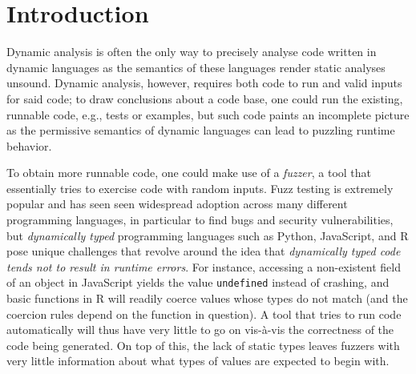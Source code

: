 \documentclass[sigplan,anonymous,review]{acmart}
\begin{document}
\begin{abstract}

\end{abstract}

\maketitle

\section{Introduction}
\label{sec:introduction}

Dynamic analysis is often the only way to precisely analyse code written in dynamic languages as the semantics of these languages render static analyses unsound. 
Dynamic analysis, however, requires both code to run and valid inputs for said code; to draw conclusions about a code base, one could run the existing, runnable code, e.g., tests or examples, but such code paints an incomplete picture as the permissive semantics of dynamic languages can lead to puzzling runtime behavior.

To obtain more runnable code, one could make use of a \textit{fuzzer}, a tool that essentially tries to exercise code with random inputs. 
Fuzz testing is extremely popular and has seen seen widespread adoption across many different programming languages, in particular to find bugs and security vulnerabilities, but \textit{dynamically typed} programming languages such as Python, JavaScript, and R pose unique challenges that revolve around the idea that \textit{dynamically typed code tends not to result in runtime errors}.
For instance, accessing a non-existent field of an object in JavaScript yields the value {\tt undefined} instead of crashing, and basic functions in R will readily coerce values whose types do not match (and the coercion rules depend on the function in question).
A tool that tries to run code automatically will thus have very little to go on vis-\`a-vis the correctness of the code being generated.
On top of this, the lack of static types leaves fuzzers with very little information about what types of values are expected to begin with.
\end{document}
